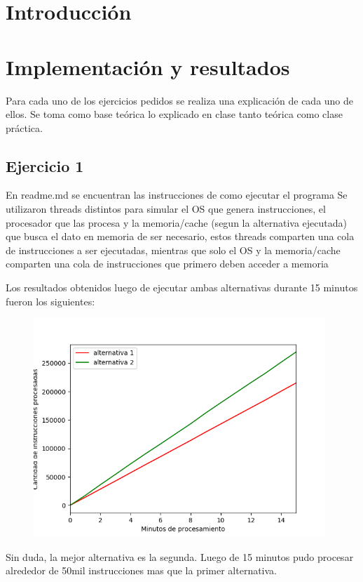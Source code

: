 \documentclass[11pt,a4paper]{article}
\begin{document}
\newpage

\section{Introducción}


\section{Implementación y resultados}
Para cada uno de los ejercicios pedidos se realiza una explicación de cada uno de ellos. Se toma como base teórica lo explicado en clase tanto teórica como clase práctica.

	\subsection{Ejercicio 1}
	    En readme.md se encuentran las instrucciones de como ejecutar el programa
	    Se utilizaron threads distintos para simular el OS que genera instrucciones, el procesador que las procesa y la memoria/cache (segun la alternativa ejecutada) que busca el dato en memoria de ser necesario, estos threads comparten una cola de instrucciones a ser ejecutadas, mientras que solo el OS y la memoria/cache comparten una cola de instrucciones que primero deben acceder a memoria

	    Los resultados obtenidos luego de ejecutar ambas alternativas durante 15 minutos fueron los siguientes:

	    \begin{figure}[H]
  			\centering
    			\includegraphics[width=11cm]{imagenes/ejercicio1}
		\end{figure}

		Sin duda, la mejor alternativa es la segunda. Luego de 15 minutos pudo procesar alrededor de 50mil instrucciones mas que la primer alternativa.
\end{document}
